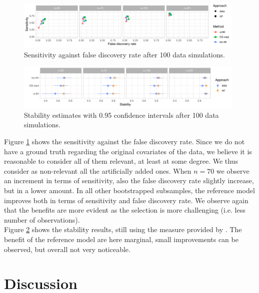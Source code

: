 \documentclass[american,]{article}
\theoremstyle{definition}
\begin{document}
\begin{figure}[tp]
  \centering
  \includegraphics[width=0.98\textwidth]{graphics/bodyfat_sensitivity_vs_fdr.pdf}
  \caption{Sensitivity against false discovery rate after 100 data simulations.\\}
  \label{fig:bodyfat_sensitivity_vs_fdr}
\end{figure}

\begin{figure}[tp]
  \centering
  \includegraphics[width=0.98\textwidth]{graphics/bodyfat_stability.pdf}
  \caption{Stability estimates with 0.95 confidence intervals after 100 data simulations.\\}
  \label{fig:bodyfat_stability}
\end{figure}

Figure \ref{fig:bodyfat_sensitivity_vs_fdr} shows the sensitivity against the false discovery rate. Since we do not have a ground truth regarding the original covariates of the data, we believe it is reasonable to consider all of them relevant, at least at some degree. We thus consider as non-relevant all the artificially added ones. When $n=70$ we observe an increment in terms of sensitivity, also the false discovery rate slightly increase, but in a lower amount. In all other bootstrapped subsamples, the reference model improves both in terms of sensitivity and false discovery rate. We observe again that the benefits are more evident as the selection is more challenging (i.e. less number of observations).
\\
Figure \ref{fig:bodyfat_stability} shows the stability results, still using the measure provided by \cite{paper:stability}. The benefit of the reference model are here marginal, small improvements can be observed, but overall not very noticeable.


\hypertarget{discussion}{%
\section{Discussion}\label{discussion}}
\end{document}

